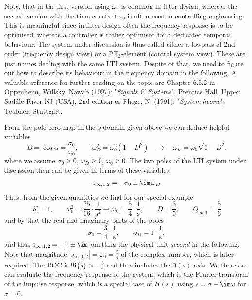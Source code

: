 \begin{mdframed}
Note, that in  the first version using $\omega_0$ is
common in filter design, whereas the second version with the time
constant $\tau_0$ is often used in controlling engineering.
%
This is meaningful since in filter design often the frequency response is to be
optimised, whereas a controller is rather optimised for a dedicated
temporal behaviour.
%
The system under discussion is thus called either a lowpass of 2nd order
(frequency design view) or a PT$_2$-element (control system view).
These are just names dealing with the same LTI system.
Despite of that, we need to figure out how to describe its behaviour in the
frequency domain in the following.
A valuable reference for further reading on the topic are Chapter 6.5.2
in Oppenheim, Willsky, Nawab (1997): "\textit{Signals \& Systems}", Prentice Hall,
Upper Saddle River NJ (USA), 2nd edition
or Fliege, N. (1991): "\textit{Systemtheorie}", Teubner, Stuttgart.
%
%
%

From the pole-zero map in the $s$-domain given above
we can deduce helpful variables
\begin{equation}
D = \cos \alpha = \frac{\sigma_0}{\omega_0},\qquad
\omega_D^2 = \omega_0^2 (1-D^2) \quad \rightarrow \quad \omega_D = \omega_0
\sqrt{1-D^2}.
\end{equation}
where we assume $\sigma_0\geq 0$, $\omega_D\geq 0$, $\omega_0\geq 0$.
%
The two poles of the LTI system under discussion then can be given in terms of
these variables
\begin{align}
s_{\infty,1,2} = -\sigma_0 \pm \im\,\omega_D
\end{align}
%
Thus, from the given quantities we find for our special example
\begin{equation}
K=1, \qquad \omega_0^2 = \frac{25}{16} \cdot \frac{1}{\text{s}^2}
\rightarrow \omega_0 = \frac{5}{4} \cdot \frac{\text{1}}{\text{s}},
\qquad D = \frac{3}{5},\qquad
Q_{\infty,1} = \frac{5}{6}
\end{equation}
and by that the real and imaginary parts of the poles
\begin{equation}
\sigma_0 = \frac{3}{4}\cdot \frac{\text{1}}{\text{s}},\qquad
\omega_D = 1 \cdot \frac{\text{1}}{\text{s}},
\end{equation}
%
and thus $s_{\infty,1,2} = -\frac{3}{4} \pm \im$
omitting the physical unit \textit{second} in the following.
%
Note that magnitude $|s_{\infty,1,2}| = \omega_0=\frac{5}{4}$ of the complex number,
which is later required.
%
The ROC is $\Re\{s\}>-\frac{3}{4}$ and thus includes the $\Im(s)$-axis.
%
We therefore can evaluate the frequency response of the system, which is the
Fourier transform of the impulse response,
which is a special case of $H(s)$ using $s=\sigma+\im\omega$ for $\sigma=0$.
\end{mdframed}







